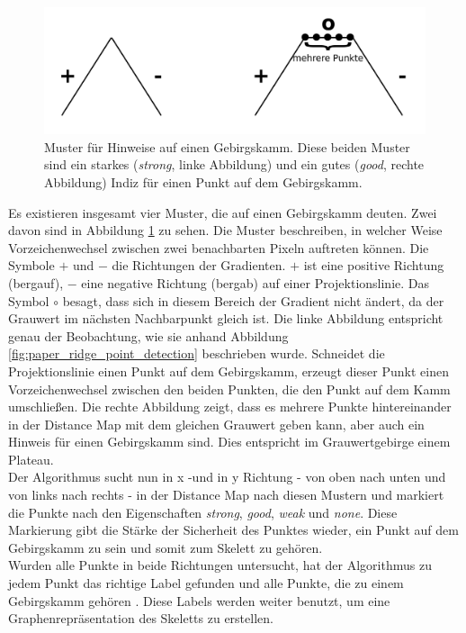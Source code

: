 \begin{figure}
\centering
\includegraphics[width=0.8\linewidth]{./fig/muster_strong_good.pdf}
\caption{Muster für Hinweise auf einen Gebirgskamm. Diese beiden Muster sind ein starkes (\emph{strong}, linke Abbildung) und ein gutes (\emph{good}, rechte Abbildung) Indiz für einen Punkt auf dem Gebirgskamm.}
\label{fig:muster_strong_good}
\end{figure}
Es existieren insgesamt vier Muster, die auf einen Gebirgskamm deuten. Zwei davon sind in Abbildung \ref{fig:muster_strong_good}
zu sehen. Die Muster beschreiben, in welcher Weise Vorzeichenwechsel zwischen zwei benachbarten Pixeln auftreten können. Die Symbole $+$ und $-$ die Richtungen der Gradienten. $+$ ist eine positive Richtung (bergauf), $-$ eine negative Richtung (bergab) auf einer Projektionslinie. Das Symbol $\circ$ besagt, dass sich in diesem Bereich der Gradient nicht ändert, da der Grauwert im nächsten Nachbarpunkt gleich ist. Die linke Abbildung entspricht genau der Beobachtung, wie sie anhand Abbildung
\ref{fig:paper_ridge_point_detection} beschrieben wurde. Schneidet die Projektionslinie einen Punkt auf dem Gebirgskamm,
erzeugt dieser Punkt einen Vorzeichenwechsel zwischen den beiden Punkten, die den Punkt auf dem Kamm umschließen. Die rechte
Abbildung zeigt, dass es mehrere Punkte hintereinander in der Distance Map mit dem gleichen Grauwert geben kann, aber auch ein
Hinweis für einen Gebirgskamm sind. Dies entspricht im Grauwertgebirge einem Plateau.\\
Der Algorithmus sucht nun in x -und in y Richtung - von oben nach unten und von links nach rechts - in der Distance Map nach diesen Mustern und markiert die Punkte nach den Eigenschaften \emph{strong}, \emph{good}, \emph{weak} und \emph{none}. 
Diese Markierung gibt die Stärke der Sicherheit des Punktes wieder, ein Punkt auf dem Gebirgskamm zu sein und somit zum Skelett zu gehören. \\
Wurden alle Punkte in beide Richtungen untersucht, hat der Algorithmus zu jedem Punkt das richtige Label gefunden und alle Punkte, die zu einem Gebirgskamm gehören \cite{extracting_skeletons_distancemaps}. Diese Labels werden weiter benutzt, um eine Graphenrepräsentation des Skeletts zu erstellen.
